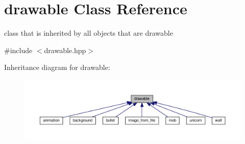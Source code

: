 \hypertarget{classdrawable}{}\section{drawable Class Reference}
\label{classdrawable}


class that is inherited by all objects that are drawable  




{\ttfamily \#include $<$drawable.\+hpp$>$}



Inheritance diagram for drawable\+:\nopagebreak
\begin{figure}[H]
\begin{center}
\leavevmode
\includegraphics[width=350pt]{classdrawable__inherit__graph}
\end{center}
\end{figure}
